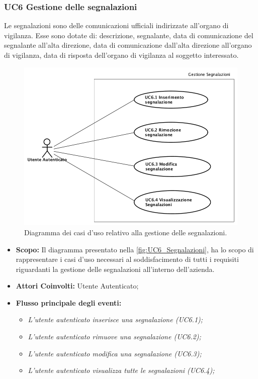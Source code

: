 	\newpage
	\subsubsection{UC6 Gestione delle segnalazioni}
		\label{section:UC6}	
		Le segnalazioni sono delle comunicazioni ufficiali indirizzate all'organo di vigilanza. Esse sono dotate di: descrizione, segnalante, data di comunicazione del segnalante all'alta direzione, data di comunicazione dall'alta direzione all'organo di vigilanza, data di risposta dell'organo di vigilanza al soggetto interessato.\\
		\begin{figure}[H]
			\begin{center}
				\includegraphics[width=12cm]{Pics/UC6Segnalazioni.png}
				\caption{Diagramma dei casi d'uso relativo alla gestione delle segnalazioni.}
				\label{fig:UC6_Segnalazioni}
			\end{center}
		\end{figure}
		
		\begin{itemize}
			\item \textbf{Scopo:} Il diagramma presentato nella \autoref{fig:UC6_Segnalazioni}, ha lo scopo di rappresentare i casi d'uso necessari al soddisfacimento di tutti i requisiti riguardanti la gestione delle segnalazioni all'interno dell'azienda. \\ 
			\item \textbf{Attori Coinvolti:} Utente Autenticato;
			\item \textbf{Flusso principale degli eventi:} 
			\begin{itemize}
				\item \textit{L'utente autenticato inserisce una segnalazione (UC6.1);}
				\item \textit{L'utente autenticato rimuove una segnalazione (UC6.2);}
				\item \textit{L'utente autenticato modifica una segnalazione (UC6.3);}
				\item \textit{L'utente autenticato visualizza tutte le segnalazioni (UC6.4);}
			\end{itemize}
		\end{itemize}
		
